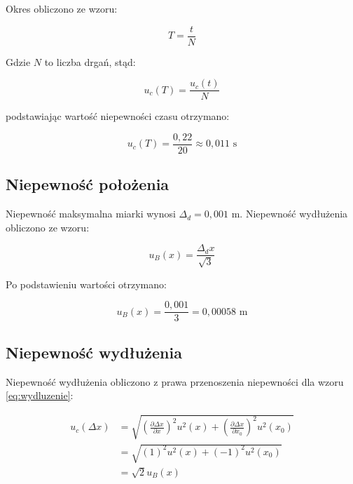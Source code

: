 \documentclass[a4paper,12pt]{article}
\begin{document}
Okres obliczono ze wzoru:

\begin{equation*}
    T = \frac{t}{N}
\end{equation*}

Gdzie $N$ to liczba drgań, stąd:

\begin{equation*}
    u_c(T) = \frac{u_c(t)}{N}
\end{equation*}

podstawiając wartość niepewności czasu otrzymano:

\begin{equation*}
    u_c(T) = \frac{0,22}{20} \approx 0,011 \text{ s}
\end{equation*}


\subsection{Niepewność położenia}

Niepewność maksymalna miarki wynosi $\Delta_d = 0,001$ m. Niepewność wydłużenia obliczono ze wzoru:

\begin{equation*}
    u_B(x) = \frac{\Delta_d x}{\sqrt{3}}
\end{equation*}

Po podstawieniu wartości otrzymano:

\begin{equation*}
    u_B(x) = \frac{0,001}{3} = 0,00058 \text{ m}
\end{equation*}

\subsection{Niepewność wydłużenia}

Niepewność wydłużenia obliczono z prawa przenoszenia niepewności dla wzoru \ref{eq:wydluzenie}:

\begin{align*}
    u_c(\Delta x) & = \sqrt{\left(\frac{\partial \Delta x}{\partial x}\right)^2 u^2(x) + \left(\frac{\partial \Delta x}{\partial x_0}\right)^2 u^2(x_0)} \\
                  & = \sqrt{(1)^2 u^2(x) + (-1)^2 u^2(x_0)}                                                                                              \\
                  & = \sqrt{2} u_B(x)
\end{align*}
\end{document}

